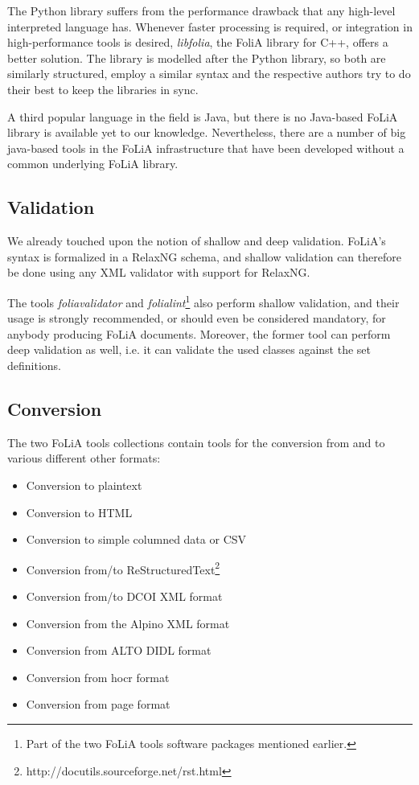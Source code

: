 \documentclass[a4paper,10pt,twoside]{article}
\begin{document}
The Python library suffers from the performance drawback that any high-level
interpreted language has. Whenever faster processing is required, or
integration in high-performance tools is desired, \emph{libfolia}, the FoliA
library for C++, offers a better solution. The library is modelled after the
Python library, so both are similarly structured, employ a similar syntax and
the respective authors try to do their best to keep the libraries in sync.

A third popular language in the field is Java, but there is no Java-based FoLiA
library is available yet to our knowledge. Nevertheless, there are a number of
big java-based tools in the FoLiA infrastructure that have been developed
without a common underlying FoLiA library.

\subsection{Validation}

We already touched upon the notion of shallow and deep validation.
FoLiA's syntax is formalized in a RelaxNG schema, and shallow validation can
therefore be done using any XML validator with support for RelaxNG. 

The tools \emph{foliavalidator} and \emph{folialint}\footnote{Part of the two
FoLiA tools software packages mentioned earlier.} also perform shallow
validation, and their usage is strongly recommended, or should even be considered
mandatory, for anybody producing FoLiA documents. Moreover, the former tool can
perform deep validation as well, i.e. it can validate the used classes against
the set definitions.

\subsection{Conversion}

The two FoLiA tools collections contain tools for the conversion from and to
various different other formats:

\begin{itemize}
    \item Conversion to plaintext
    \item Conversion to HTML
    \item Conversion to simple columned data or CSV
    \item Conversion from/to ReStructuredText\footnote{http://docutils.sourceforge.net/rst.html}
    \item Conversion from/to DCOI XML format \cite{DCOI}
    \item Conversion from the Alpino XML format \cite{ALPINO}
    \item Conversion from ALTO DIDL format %
    \item Conversion from hocr format  %
    \item Conversion from page format  %
\end{itemize}
\end{document}
